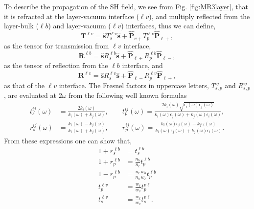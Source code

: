 To describe the propagation of the SH field, we  see from
Fig. \ref{fig:MR3layer}, that it is refracted at the 
layer-vacuum interface ($\ell v$), and multiply reflected from the
layer-bulk ($\ell b$)
and layer-vacuum ($\ell v$)
interfaces, thus we can define,
\begin{equation}\label{r5}
\mathbf{T}^{\ell v}
= \hat{\mathbf{s}}T_s^{\ell v}\hat{\mathbf{s}} 
+ \hat{\mathbf{P}}_{v+}T_{p}^{\ell v} \hat{\mathbf{P}}_{\ell +},
\end{equation}
as the tensor for transmission from $\ell v$ interface,
\begin{equation}\label{r6}
\mathbf{R}^{\ell b}
= \hat{\mathbf{s}}R_s^{\ell b}\hat{\mathbf{s}}
+ \hat{\mathbf{P}}_{\ell +}R_{p}^{\ell b} \hat{\mathbf{P}}_{\ell -},
\end{equation} 
as the tensor of reflection from the $\ell b$ interface, 
and
\begin{equation}\label{r6b}
\mathbf{R}^{\ell v}
= \hat{\mathbf{s}}R_s^{\ell v}\hat{\mathbf{s}}
+ \hat{\mathbf{P}}_{\ell -}R_{p}^{\ell v} \hat{\mathbf{P}}_{\ell +},
\end{equation} 
as that of the $\ell v$ interface. 
The Fresnel factors in uppercase letters, $T^{ij}_{s,p}$ and $R^{ij}_{s,p}$,
are evaluated at $2\omega$  from the following well known formulas 
\begin{equation}\label{e.f1}
\begin{split}
t_s^{ij}(\omega) &=
\frac{2k_{i}(\omega)}{k_{i}(\omega)+k_{j}(\omega)},
\quad\quad  
t_{p}^{ij}(\omega) =
\frac{2k_{i}(\omega)\sqrt{\epsilon_{i}(\omega)\epsilon_j(\omega)}}
     {k_{i}(\omega)\epsilon_{j}(\omega)+k_{j}(\omega)\epsilon_{i}(\omega)},\\
r_s^{ij}(\omega) &=
\frac{k_{i}(\omega) - k_{j}(\omega)}
     {k_{i}(\omega) + k_{j}(\omega)},
\quad\quad 
r_{p}^{ij}(\omega) =
\frac{k_{i}(\omega)\epsilon_{j}(\omega) - k_{j}\epsilon_{i}(\omega)}
     {k_{i}(\omega)\epsilon_{j}(\omega) + k_{j}(\omega)\epsilon_{i}(\omega)}. 
\end{split}
\end{equation}
From these expressions one can show that,
\begin{align}\label{mf}
1 + r^{\ell b}_{s} &= t^{\ell b}_{s}\nonumber\\
1 + r^{\ell b}_{p}
&= \frac{n_b}{n_\ell}
t^{\ell b}_{p} 
\nonumber\\
1 - r^{\ell b}_{p}
&= \frac{n_\ell}{n_b}
   \frac{w_{b}}{w_{\ell}}t^{\ell b}_{p}\\
t^{\ell v}_{p} &= \frac{w_{\ell}}{w_{v}}t^{v\ell}_{p}\nonumber\\
t^{\ell v}_{s} &= \frac{w_{\ell}}{w_{v}}t^{v\ell}_{s}\nonumber 
.
\end{align}


